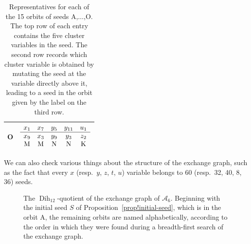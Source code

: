 \documentclass[10pt,a4paper]{amsart}
\numberwithin{equation}{section}
\theoremstyle{definition}
\DeclareMathOperator{\Dih}{Dih}
\begin{document}
\begin{table}[th!]
\begin{tabular}{|c|c|}
O & $\begin{array}{ccccc}
x_1&x_7&y_5&y_{11}&u_1 \\ \hline
x_9&x_3&y_9&y_3&z_2 \\
\text M&\text M&\text N&\text N&\text K
\end{array}$ \\ \hline
\end{tabular}
\caption{Representatives for each of the 15 orbits of seeds A,$\ldots$,O. The top row of each entry contains the five cluster variables in the seed. The second row records which cluster variable is obtained by mutating the seed at the variable directly above it, leading to a seed in the orbit given by the label on the third row.}\label{tab!seeds}
\end{table}

We can also check various things about the structure of the exchange graph, such as the fact that every $x$ (resp.\ $y$, $z$, $t$, $u$) variable belongs to 60 (resp.\ 32, 40, 8, 36) seeds.

\begin{figure}[t]
\centering
{}
\caption{The $\Dih_{12}$-quotient of the exchange graph of $\mathcal A_6$. Beginning with the initial seed $S$ of Proposition~\ref{prop!initial-seed}, which is in the orbit A, the remaining orbits are named alphabetically, according to the order in which they were found during a breadth-first search of the exchange graph.}\label{fig!exchange-graph}
\end{figure}
\end{document}
